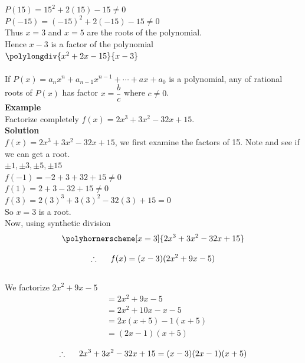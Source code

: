 \documentclass[11pt,a4paper]{article}
\begin{document}
$P(15)=15^2+2(15)-15\neq 0$\\

$P(-15)=(-15)^2+2(-15)-15\neq 0$\\

Thus $x=3$ and $x=5$ are the roots of the polynomial.\\
Hence $x-3$ is a factor of the polynomial \\

$\polylongdiv{x^2+2x-15}{x-3}$\\\\

If $P(x)=a_nx^n+a_{n-1}x^{n-1}+\cdots+ax+a_0$ is a polynomial, any of rational roots of $P(x)$ has factor $x=\dfrac{b}{c}$ where $c\neq 0$.\\

\textbf{Example}\\
Factorize completely $f(x)=2x^3+3x^2-32x+15$.\\

\textbf{Solution}\\
$f(x)=2x^3+3x^2-32x+15$, we first examine the factors of 15. Note and see if we can get a root.\\

$\pm 1, \pm 3, \pm 5, \pm 15$\\

$f(-1)=-2+3+32+15\neq 0$\\

$f(1) =2+3-32+15\neq 0$\\

$f(3) = 2(3)^3+3(3)^2-32(3)+15=0$\\

So $x=3$ is a root.\\

Now, using synthetic division
$$\polyhornerscheme[x=3]{2x^3+3x^2-32x+15}$$

$$\therefore \hspace{0.5cm} f(x)=(x-3)(2x^2+9x-5)$$\\

We factorize $2x^2+9x-5$
\begin{align*}
& = 2x^2+9x-5\\
& = 2x^2+10x-x-5\\
& = 2x(x+5)-1(x+5)\\
& = (2x-1)(x+5)
\end{align*}

$$\therefore\hspace{0.5cm} 2x^3+3x^2-32x+15=(x-3)(2x-1)(x+5)$$\\\\
\end{document}
